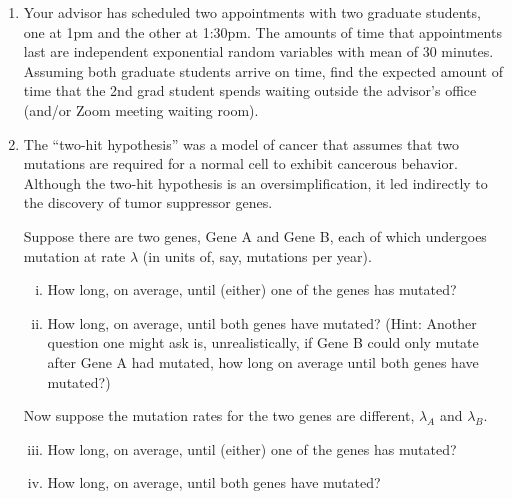 \documentclass[12pt,letterpaper]{article}
\begin{document}
\begin{enumerate}


\item Your advisor has scheduled two appointments with two graduate students, one at 1pm and the other at 1:30pm. The amounts of time that appointments last are independent exponential random variables with mean of 30 minutes. Assuming both graduate students arrive on time, find the expected amount of time that the 2nd grad student spends waiting outside the advisor's office (and/or Zoom meeting waiting room).


\item The ``two-hit hypothesis'' was a model of cancer that assumes that two mutations are required for a normal cell to exhibit cancerous behavior.
Although the two-hit hypothesis is an oversimplification, it led indirectly to the discovery of tumor suppressor genes.

Suppose there are two genes, Gene A and Gene B, each of which undergoes mutation at rate $\lambda$ (in units of, say, mutations per year).  

\begin{enumerate}[i.]
    \item How long, on average, until (either) one of the genes has mutated? 
    \item How long, on average, until both genes have mutated? 
    (Hint: Another question one might ask is, unrealistically, if Gene B could only mutate after Gene A had mutated, how long on average until both genes have mutated?)
\end{enumerate}


Now suppose the mutation rates for the two genes are different, $\lambda_A$ and $\lambda_B$.

\begin{enumerate}[i.]
  \setcounter{enumii}{2}
  \item How long, on average, until (either) one of the genes has mutated? 
  \item How long, on average, until both genes have mutated?
\end{enumerate}


\end{enumerate}
\end{document}
